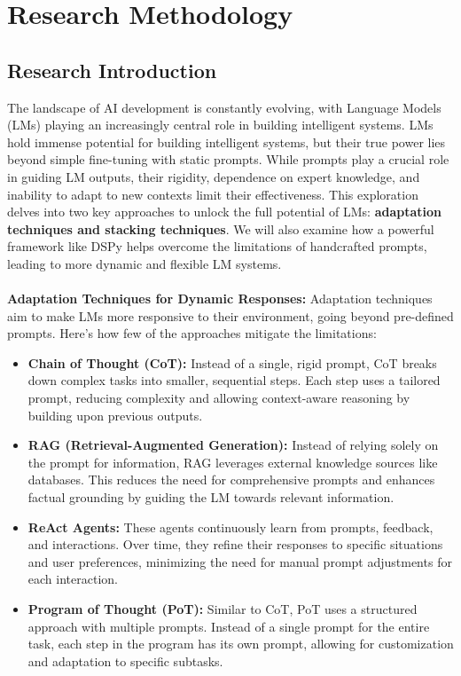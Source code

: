 \chapter{Research Methodology}

\section{Research Introduction}
The landscape of AI development is constantly evolving, with Language Models (LMs) playing an increasingly central role in building intelligent systems. LMs hold immense potential for building intelligent systems, but their true power lies beyond simple fine-tuning with static prompts. While prompts play a crucial role in guiding LM outputs, their rigidity, dependence on expert knowledge, and inability to adapt to new contexts limit their effectiveness. This exploration delves into two key approaches to unlock the full potential of LMs: \textbf{adaptation techniques and stacking techniques}. We will also examine how a powerful framework like DSPy helps overcome the limitations of handcrafted prompts, leading to more dynamic and flexible LM systems.\\
\\
\textbf{Adaptation Techniques for Dynamic Responses:} Adaptation techniques aim to make LMs more responsive to their environment, going beyond pre-defined prompts. Here's how few of the approaches mitigate the limitations:
\begin{itemize}
    \item \textbf{Chain of Thought (CoT):} Instead of a single, rigid prompt, CoT breaks down complex tasks into smaller, sequential steps. Each step uses a tailored prompt, reducing complexity and allowing context-aware reasoning by building upon previous outputs.

    \item \textbf{RAG (Retrieval-Augmented Generation):} Instead of relying solely on the prompt for information, RAG leverages external knowledge sources like databases. This reduces the need for comprehensive prompts and enhances factual grounding by guiding the LM towards relevant information.

    \item \textbf{ReAct Agents:} These agents continuously learn from prompts, feedback, and interactions. Over time, they refine their responses to specific situations and user preferences, minimizing the need for manual prompt adjustments for each interaction.

    \item \textbf{Program of Thought (PoT):} Similar to CoT, PoT uses a structured approach with multiple prompts. Instead of a single prompt for the entire task, each step in the program has its own prompt, allowing for customization and adaptation to specific subtasks.
\end{itemize}
